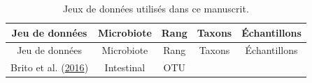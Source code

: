 \documentclass[12pt,a4paper]{reedthesis}
\theoremstyle{definition}
\theoremstyle{definition}
\theoremstyle{definition}
\theoremstyle{remark}
\begin{document}
\begin{longtable}[]{@{}ccccc@{}}
\caption{\label{tab:datasets} Jeux de données utilisés dans ce manuscrit.}\tabularnewline
\toprule
\begin{minipage}[b]{0.29\columnwidth}\centering
Jeu de données\strut
\end{minipage} & \begin{minipage}[b]{0.18\columnwidth}\centering
Microbiote\strut
\end{minipage} & \begin{minipage}[b]{0.10\columnwidth}\centering
Rang\strut
\end{minipage} & \begin{minipage}[b]{0.12\columnwidth}\centering
Taxons\strut
\end{minipage} & \begin{minipage}[b]{0.16\columnwidth}\centering
Échantillons\strut
\end{minipage}\tabularnewline
\midrule
\endfirsthead
\toprule
\begin{minipage}[b]{0.29\columnwidth}\centering
Jeu de données\strut
\end{minipage} & \begin{minipage}[b]{0.18\columnwidth}\centering
Microbiote\strut
\end{minipage} & \begin{minipage}[b]{0.10\columnwidth}\centering
Rang\strut
\end{minipage} & \begin{minipage}[b]{0.12\columnwidth}\centering
Taxons\strut
\end{minipage} & \begin{minipage}[b]{0.16\columnwidth}\centering
Échantillons\strut
\end{minipage}\tabularnewline
\midrule
\endhead
\begin{minipage}[t]{0.29\columnwidth}\centering
Brito et al. (\protect\hyperlink{ref-brito2016mobile}{2016})\strut
\end{minipage} & \begin{minipage}[t]{0.18\columnwidth}\centering
Intestinal\strut
\end{minipage} & \begin{minipage}[t]{0.10\columnwidth}\centering
OTU\strut
\end{minipage} & \begin{minipage}[t]{0.12\columnwidth}\centering
77\strut
\end{minipage} & \begin{minipage}[t]{0.16\columnwidth}\centering

\end{minipage}
\end{longtable}
\end{document}
